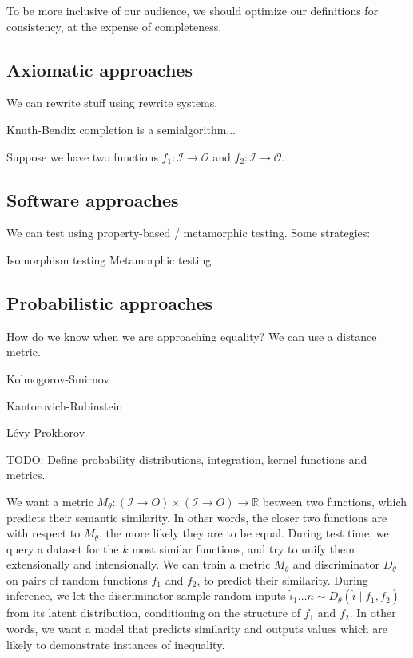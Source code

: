 \documentclass[11pt]{article}
\begin{document}
    To be more inclusive of our audience, we should optimize our definitions for consistency, at the expense of completeness.

    \subsection{Axiomatic approaches}

    We can rewrite stuff using rewrite systems.

    Knuth-Bendix completion is a semialgorithm...

    Suppose we have two functions $f_1: \mathcal{I} \rightarrow \mathcal{O}$ and $f_2: \mathcal{I}\rightarrow \mathcal{O}$.


    \subsection{Software approaches}

    We can test using property-based / metamorphic testing. Some strategies:

    Isomorphism testing
    Metamorphic testing

    \subsection{Probabilistic approaches}

    How do we know when we are approaching equality? We can use a distance metric.

    Kolmogorov-Smirnov

    Kantorovich-Rubinstein

    L\'evy-Prokhorov

    TODO: Define probability distributions, integration, kernel functions and metrics.

    We want a metric $M_\theta: (\mathcal{I}\rightarrow{O}) \times (\mathcal{I}\rightarrow{O})\rightarrow \mathbb{R}$ between two functions, which predicts their semantic similarity. In other words, the closer two functions are with respect to $M_\theta$, the more likely they are to be equal. During test time, we query a dataset for the $k$ most similar functions, and try to unify them extensionally and intensionally. We can train a metric $M_\theta$ and discriminator $D_\theta$ on pairs of random functions $f_1$ and $f_2$, to predict their similarity. During inference, we let the discriminator sample random inputs $\hat i_1 \ldots n \sim D_\theta(\hat i \mid f_1, f_2)$ from its latent distribution, conditioning on the structure of $f_1$ and $f_2$. In other words, we want a model that predicts similarity and outputs values which are likely to demonstrate instances of inequality.
\end{document}

